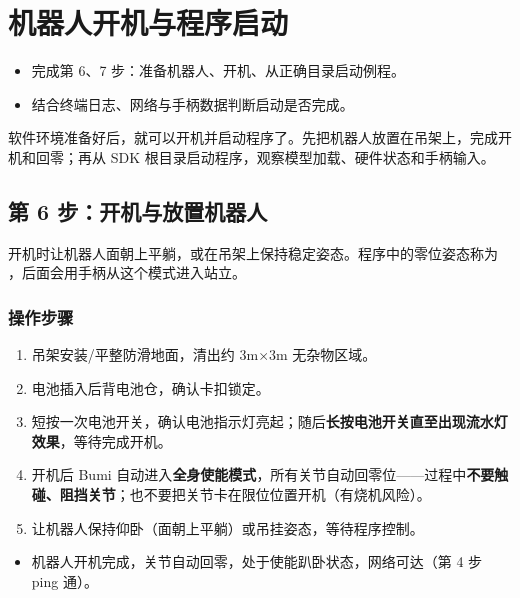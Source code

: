 \chapter{机器人开机与程序启动}
\begin{intro}
\begin{itemize}
\item 完成第 6、7 步：准备机器人、开机、从正确目录启动例程。
\item 结合终端日志、网络与手柄数据判断启动是否完成。
\end{itemize}
\end{intro}
软件环境准备好后，就可以开机并启动程序了。先把机器人放置在吊架上，完成开机和回零；再从 SDK 根目录启动程序，观察模型加载、硬件状态和手柄输入。

\section{第 6 步：开机与放置机器人}
\label{step:6}
开机时让机器人面朝上平躺，或在吊架上保持稳定姿态。程序中的零位姿态称为 ，后面会用手柄从这个模式进入站立。


\subsection*{操作步骤}

\begin{enumerate}
\item 吊架安装/平整防滑地面，清出约 3m$\times$3m 无杂物区域。
\item 电池插入后背电池仓，确认卡扣锁定。
\item 短按一次电池开关，确认电池指示灯亮起；随后\textbf{长按电池开关直至出现流水灯效果}，等待完成开机。
\item 开机后 Bumi 自动进入\textbf{全身使能模式}，所有关节自动回零位——过程中\textbf{不要触碰、阻挡关节}；也不要把关节卡在限位位置开机（有烧机风险）。
\item 让机器人保持仰卧（面朝上平躺）或吊挂姿态，等待程序控制。

\end{enumerate}
\begin{expected}
\begin{itemize}
\item 机器人开机完成，关节自动回零，处于使能趴卧状态，网络可达（第 4 步 ping 通）。

\end{itemize}
\end{expected}
